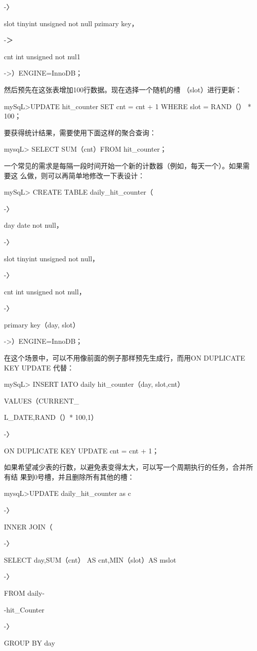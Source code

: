 -〉

slot tinyint unsigned not null pzimary key，

-＞

cnt int unsigned not nul1

->）ENGINE=InnoDB；

然后预先在这张表增加100行数据。现在选择一个随机的槽 （slot）进行更新：

mySqL>UPDATE hit\_counter SET cnt = cnt + 1 WHERE slot = RAND（） * 100；

要获得统计结果，需要使用下面这样的聚合查询：

mysqL> SELECT SUM（cnt）FROM hit\_counter；

一个常见的需求是每隔一段时间开始一个新的计数器（例如，每天一个）。如果需要这
么做，则可以再简单地修改一下表设计：

mySqL> CREATE TABLE daily\_hit\_counter（

-〉

day date not null，

-〉

slot tinyint unsigned not null，

-〉

cnt int unsigned not null，

-〉

primary key（day, slot）

->）ENGINE=InnoDB；

在这个场景中，可以不用像前面的例子那样预先生成行，而用ON DUPLICATE KEY
UPDATE 代替：

mySqL> INSERT IATO daily hit\_counter（day, slot,cnt）

VALUES（CURRENT\_

L\_DATE,RAND（）* 100,1）

-〉

ON DUPLICATE KEY UPDATE cnt = cnt + 1；

如果希望减少表的行数，以避免表变得太大，可以写一个周期执行的任务，合并所有结
果到0号槽，并且删除所有其他的槽：

mysqL>UPDATE daily\_hit\_counter as c

-〉

INNER JOIN（

-〉

SELECT day,SUM（cnt） AS cnt,MIN（slot）AS mslot

-〉

FROM daily-

-hit\_Counter

-〉

GROUP BY day

